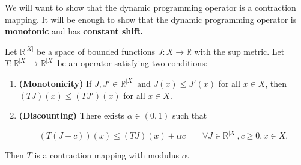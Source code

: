 We will want to show that the dynamic programming operator is a contraction mapping. It will be enough to show that the dynamic programming operator is \textbf{monotonic} and has \textbf{constant shift.}

\begin{theorem}\label{dp.blackwell.sc}

Let \(\mathbb{R}^{|X|}\) be a space of bounded functions \(J: X \to \mathbb{R}\) with the sup metric. Let \(T: \mathbb{R}^{|X|} \to \mathbb{R}^{|X|}\) be an operator satisfying two conditions:

\begin{enumerate}

\item \textbf{(Monotonicity)} If \(J, J' \in \mathbb{R}^{|X|}\) and \(J(x) \leq J'(x)\) for all \(x \in X\), then \((TJ)(x) \leq (TJ')(x)\) for all \(x \in X\).

\item \textbf{(Discounting)} There exists \(\alpha \in (0,1)\) such that 

\[
(T(J + c))(x) \leq (TJ)(x) + \alpha c \qquad \forall J \in \mathbb{R}^{|X|}, c \geq 0, x \in X.
\]

\end{enumerate}

Then \(T\) is a contraction mapping with modulus \(\alpha\).

\end{theorem}

